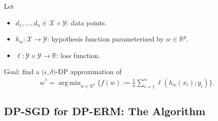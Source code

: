 \documentclass{beamer}
\newcommand{\cX}{\mathcal{X}}
\newcommand{\cY}{\mathcal{Y}}
\newcommand{\RR}{\mathbb{R}}
\DeclareMathOperator*{\argmin}{arg\,min}
\begin{document}
\begin{frame}
  Let
  \begin{itemize}
  \item $d_1, \dots, d_n \in \cX \times \cY$: data points.
  \item $h_w : \cX \rightarrow \cY$: hypothesis function parameterized by $w \in \RR^p$.
  \item $\ell : \cY \times \cY \rightarrow \RR$: loss function.
  \end{itemize}

  \vspace{1em}

  Goal: find a \alert{$\mathbf(\epsilon, \delta)$-DP approximation} of
  \begin{align*}
    w^* = \argmin_{w\in\RR^p} \Bigg\{ f(w) := \frac{1}{n} \sum_{i=1}^n \ell(h_w(x_i); y_i) \Bigg\}.
  \end{align*}

  \vspace{2em}


\end{frame}

\subsection{DP-SGD for DP-ERM: The Algorithm}





\end{document}

